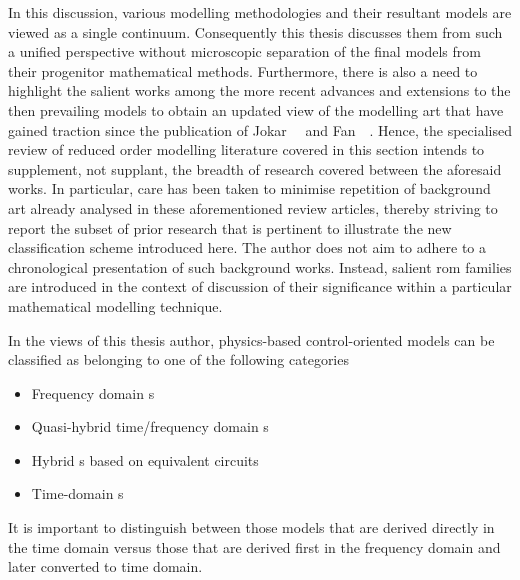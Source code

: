 In this discussion,  various modelling methodologies and  their resultant models
are viewed as  a single continuum. Consequently this thesis  discusses them from
such a  unified perspective without  microscopic separation of the  final models
from their progenitor mathematical methods. Furthermore, there is also a need to
highlight the salient works among the more recent advances and extensions to the
then  prevailing models  to obtain  an updated  view of  the modelling  art that
have  gained  traction  since the  publication  of  Jokar~\etal~\cite{Jokar2016}
and  Fan~\etal~\cite{Fan2015}. Hence,  the specialised  review of  reduced order
modelling  literature  covered  in  this  section  intends  to  supplement,  not
supplant,  the breadth  of  research  covered between  the  aforesaid works.  In
particular, care has been taken to minimise repetition of background art already
analysed in these aforementioned review articles, thereby striving to report the
subset of prior research that is  pertinent to illustrate the new classification
scheme introduced  here. The author  does not aim  to adhere to  a chronological
presentation of such  background works. Instead, salient  \gls{rom} families are
introduced  in  the  context  of  discussion  of  their  significance  within  a
particular mathematical modelling technique.


In the views of this thesis author, physics-based control-oriented models can be
classified as belonging to one of the following categories
\begin{itemize}
    \item Frequency domain s
    \item Quasi-hybrid time/frequency domain s
    \item Hybrid s based on equivalent circuits
    \item Time-domain s
\end{itemize}
It is important to distinguish between those models that are derived directly in
the time  domain versus  those that  are derived first  in the  frequency domain
and  later  converted  to  time  domain.


